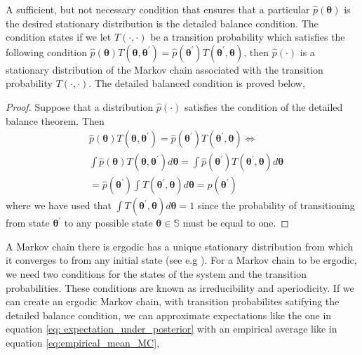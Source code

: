 A sufficient, but not necessary condition that ensures that a particular $\hat{p}(\boldsymbol{\theta})$ is the desired stationary distribution is the detailed balance condition. The condition states if we let $T(\cdot,\cdot)$ be a transition probability which satisfies the following condition $\hat{p}(\boldsymbol{\theta})T(\boldsymbol{\theta}, \boldsymbol{\theta}^\prime) = \hat{p}(\boldsymbol{\theta}^\prime)T(\boldsymbol{\theta}^\prime, \boldsymbol{\theta})$, then $\hat{p}(\cdot)$ is a stationary distribution of the Markov chain associated with the transition probability $T(\cdot,\cdot)$. The detailed balanced condition is proved below, 
\begin{proof}
Suppose that a distribution $\hat{p}(\cdot)$ satisfies the condition of the detailed balance theorem. Then
 \begin{equation*}
     \begin{split}
         &\hat{p}(\boldsymbol{\theta})T(\boldsymbol{\theta},\boldsymbol{\theta}^\prime)= \hat{p}(\boldsymbol{\theta}^\prime)T(\boldsymbol{\theta}^\prime,\boldsymbol{\theta}) \Leftrightarrow \\
          &\int\hat{p}(\boldsymbol{\theta})T(\boldsymbol{\theta},\boldsymbol{\theta}^\prime)d\boldsymbol{\theta}=\int \hat{p}(\boldsymbol{\theta}^\prime)T(\boldsymbol{\theta}^\prime,\boldsymbol{\theta}) d\boldsymbol{\theta} \\
         &= \hat{p}(\boldsymbol{\theta}^\prime)\int T(\boldsymbol{\theta}^\prime,\boldsymbol{\theta})d\boldsymbol{\theta} =\hat{p}(\boldsymbol{\theta}^\prime)
     \end{split}
\end{equation*}
where we have used that $\int T(\boldsymbol{\theta}^\prime,\boldsymbol{\theta})d\boldsymbol{\theta}=1$ since the probability of transitioning from state $\boldsymbol{\theta}^\prime$ to any possible state $\boldsymbol{\theta}\in\mathbb{S}$ must be equal to one. 
\end{proof}
A Markov chain there is ergodic has a unique stationary distribution from which it converges to from any initial state (see e.g \cite{turkman2019computational}). For a Markov chain to be ergodic, we need two conditions for the states of the system and the transition probabilities. These conditions are known as irreducibility and aperiodicity. If we can create an ergodic Markov chain, with transition probabilites satifying the detailed balance condition, we can approximate expectations like the one in equation \ref{eq: expectation_under_posterior} with an empirical average like in equation \ref{eq:empirical_mean_MC},
